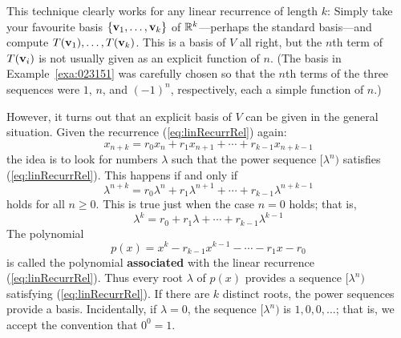 This technique clearly works for any linear recurrence of length $k$: Simply take your favourite basis $\{\textbf{v}_{1}, \dots, \textbf{v}_{k}\}$ of $\mathbb{R}^k$---perhaps the standard basis---and compute $T(\textbf{v}_{1}), \dots, T(\textbf{v}_{k})$. This is a basis of $V$ all right, but the $n$th term of $T(\textbf{v}_{i})$ is not usually given as an explicit function of $n$. (The basis in Example~\ref{exa:023151} was carefully chosen so that the $n$th terms of the three sequences were $1$, $n$, and $(-1)^{n}$, respectively, each a simple function of $n$.)


However, it turns out that an explicit basis of $V$ can be given in the general situation. Given the recurrence (\ref{eq:linRecurrRel}) again:
\begin{equation*}
x_{n+k} = r_{0}x_{n} + r_{1}x_{n+1} + \cdots + r_{k-1}x_{n+k-1}
\end{equation*}
the idea is to look for numbers $\lambda$ such that the power sequence $[\lambda^{n})$ satisfies (\ref{eq:linRecurrRel}). This happens if and only if
\begin{equation*}
\lambda^{n+k} = r_{0}\lambda^{n} + r_{1}\lambda^{n+1} + \cdots + r_{k-1}\lambda^{n+k-1}
\end{equation*}
holds for all $n \geq 0$. This is true just when the case $n = 0$ holds; that is,
\begin{equation*}
\lambda^k = r_0 + r_1\lambda + \cdots + r_{k-1}\lambda^{k-1}
\end{equation*}
The polynomial
\begin{equation*}
p(x) = x^k - r_{k-1}x^{k-1} - \cdots - r_1x - r_0
\end{equation*}
is called the polynomial \textbf{associated} with the linear recurrence (\ref{eq:linRecurrRel}). Thus every root $\lambda$ of $p(x)$ provides a sequence $[\lambda^{n})$ satisfying (\ref{eq:linRecurrRel}). If there are $k$ distinct roots, the power sequences provide a basis. Incidentally, if $\lambda = 0$, the sequence $[\lambda^{n})$ is $1, 0, 0, \dots$; that is, we accept the convention that $0^{0} = 1$.


